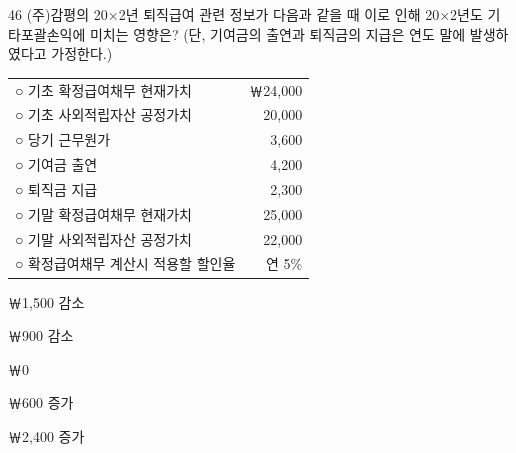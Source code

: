 \begin{question}{46}
(주)감평의 20×2년 퇴직급여 관련 정보가 다음과 같을 때 이로 인해 20×2년도 기타포괄손익에 미치는 영향은? (단, 기여금의 출연과 퇴직금의 지급은 연도 말에 발생하였다고 가정한다.)
\begin{framedtext}
\begin{tabularx}{\linewidth}{@{}Xr@{}}
○ 기초 확정급여채무 현재가치 & ￦24,000 \\
○ 기초 사외적립자산 공정가치 & 20,000 \\
○ 당기 근무원가 & 3,600 \\
○ 기여금 출연 & 4,200 \\
○ 퇴직금 지급 & 2,300 \\
○ 기말 확정급여채무 현재가치 & 25,000 \\
○ 기말 사외적립자산 공정가치 & 22,000 \\
○ 확정급여채무 계산시 적용할 할인율 & 연 5\% \\
\end{tabularx}
\end{framedtext}
\begin{choices}
  \item ￦1,500 감소
  \item ￦900 감소
  \item ￦0
  \item ￦600 증가
  \item ￦2,400 증가
\end{choices}
\end{question}
